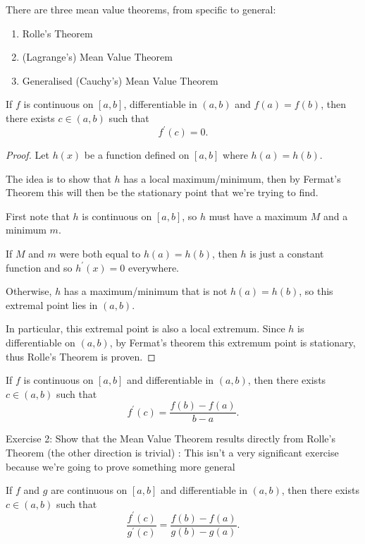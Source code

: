 There are three mean value theorems, from specific to general:
\begin{enumerate}
\item Rolle's Theorem
\item (Lagrange's) Mean Value Theorem
\item Generalised (Cauchy's) Mean Value Theorem
\end{enumerate}

\begin{theorem}
If $f$ is continuous on $[a,b]$, differentiable in $(a,b)$ and $f(a)=f(b)$, then there exists $c\in(a,b)$ such that 
\[ f^\prime(c)=0. \]
\end{theorem}

\begin{proof}
Let $h(x)$ be a function defined on $[a,b]$ where $h(a)=h(b)$.

The idea is to show that $h$ has a local maximum/minimum, then by Fermat's Theorem this will then be the stationary point that we're trying to find.

First note that $h$ is continuous on $[a,b]$, so $h$ must have a maximum $M$ and a minimum $m$.

If $M$ and $m$ were both equal to $h(a)=h(b)$, then $h$ is just a constant function and so $h^\prime(x)=0$ everywhere.

Otherwise, $h$ has a maximum/minimum that is not $h(a)=h(b)$, so this extremal point lies in $(a,b)$.

In particular, this extremal point is also a local extremum.
Since $h$ is differentiable on $(a,b)$, by Fermat's theorem this extremum point is stationary, thus Rolle's Theorem is proven.
\end{proof}

\begin{theorem}
If $f$ is continuous on $[a,b]$ and differentiable in $(a,b)$, then there exists $c\in(a,b)$ such that
\[ f^\prime(c)=\frac{f(b)-f(a)}{b-a}. \]
\end{theorem}

Exercise 2: Show that the Mean Value Theorem results directly from Rolle's Theorem (the other direction is trivial)
:
This isn't a very significant exercise because we're going to prove something more general

\begin{theorem}
If $f$ and $g$ are continuous on $[a,b]$ and differentiable in $(a,b)$, then there exists $c\in(a,b)$ such that
\[ \frac{f^\prime(c)}{g^\prime(c)}=\frac{f(b)-f(a)}{g(b)-g(a)}. \]
\end{theorem}


